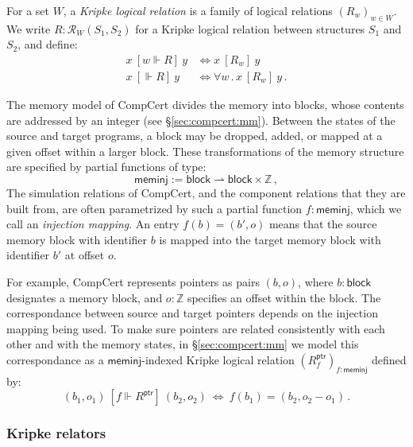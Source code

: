 \documentclass[sigplan,10pt,review,anonymous]{acmart}
\newcommand{\kw}[1]{\ensuremath{ \mathsf{#1} }}
\newcommand{\ifr}[1]{\ [{#1}]\ }
\begin{document}
\begin{definition}
For a set $W$,
a \emph{Kripke logical relation} is
a family of logical relations $(R_w)_{w \in W}$.
We write $R : \mathcal{R}_W(S_1, S_2)$
for a Kripke logical relation between structures $S_1$ and $S_2$,
and define:
\begin{align*}
  x \ifr{w \Vdash R} y &\Leftrightarrow x \ifr{R_w} y \\
  x \ifr{\Vdash R} y &\Leftrightarrow \forall w \,.\, x \ifr{R_w} y \,.
\end{align*}
\end{definition}

\begin{example} \label{ex:meminj} %
The memory model of CompCert divides the memory into blocks,
whose contents are addressed by an integer
(see \S\ref{sec:compcert:mm}).
Between the states of the source and target programs,
a block may be dropped, added, or
mapped at a given offset within a larger block.
These transformations of the memory structure
are specified by partial functions of type:
\[
  \kw{meminj} := \kw{block} \rightharpoonup \kw{block} \times \mathbb{Z} \,,
\]
The simulation relations of CompCert,
and the component relations that they are built from,
are often parametrized by such a partial function $f : \kw{meminj}$,
which we call an \emph{injection mapping}.
An entry $f(b) = (b', o)$
means that the source memory block with identifier $b$
is mapped into the target memory block with identifier $b'$
at offset $o$.

For example,
CompCert represents pointers as pairs $(b, o)$, where
$b : \kw{block}$ designates a memory block, and
$o : \mathbb{Z}$ specifies an offset within the block.
The correspondance between source and target pointers
depends on the injection mapping being used.
To make sure pointers are related consistently
with each other and with the memory states,
in \S\ref{sec:compcert:mm}
we model this correspondance as a $\kw{meminj}$-indexed
Kripke logical relation $(R^\kw{ptr}_f)_{f : \kw{meminj}}$
defined by:
\[
    (b_1, o_1) \ifr{f \Vdash R^\kw{ptr}} (b_2, o_2) \:\Leftrightarrow\:
    f(b_1) = (b_2, o_2 - o_1) \,.
\]
\end{example}

\subsubsection{Kripke relators}
\end{document}
